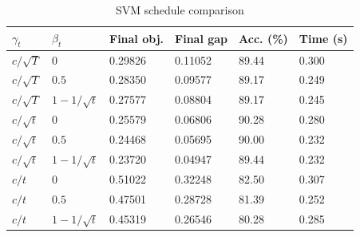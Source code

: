 \documentclass[11pt]{article}
\theoremstyle{definition}
\theoremstyle{remark}
\begin{document}
\begin{table}[H]
    \centering
    \caption{SVM schedule comparison}
    \label{tab:svm}
    \small
    \begin{tabular}{llllll}
        \toprule
        $\gamma_t$ & $\beta_t$ & Final obj. & Final gap & Acc. (\%) & Time (s) \\
        \midrule
        $c/\sqrt{T}$ & $0$ & 0.29826 & 0.11052 & 89.44 & 0.300 \\
        $c/\sqrt{T}$ & $0.5$ & 0.28350 & 0.09577 & 89.17 & 0.249 \\
        $c/\sqrt{T}$ & $1-1/\sqrt{t}$ & 0.27577 & 0.08804 & 89.17 & 0.245 \\
        $c/\sqrt{t}$ & $0$ & 0.25579 & 0.06806 & 90.28 & 0.280 \\
        $c/\sqrt{t}$ & $0.5$ & 0.24468 & 0.05695 & 90.00 & 0.232 \\
        $c/\sqrt{t}$ & $1-1/\sqrt{t}$ & 0.23720 & 0.04947 & 89.44 & 0.232 \\
        $c/t$ & $0$ & 0.51022 & 0.32248 & 82.50 & 0.307 \\
        $c/t$ & $0.5$ & 0.47501 & 0.28728 & 81.39 & 0.252 \\
        $c/t$ & $1-1/\sqrt{t}$ & 0.45319 & 0.26546 & 80.28 & 0.285 \\
        \bottomrule
    \end{tabular}
\end{table}
\end{document}
